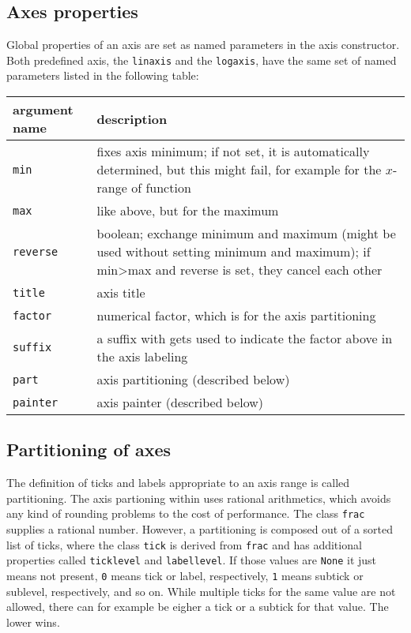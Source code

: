 \subsection{Axes properties}

Global properties of an axis are set as named parameters in the axis
constructor. Both predefined axis, the \verb|linaxis| and the
\verb|logaxis|, have the same set of named parameters listed in the
following table:

\medskip
\begin{tabularx}{\linewidth}{l>{\raggedright\arraybackslash}X}
argument name&description\\
\hline
\texttt{min}&fixes axis minimum; if not set, it is automatically
determined, but this might fail, for example for the $x$-range of
function\\
\texttt{max}&like above, but for the maximum\\
\texttt{reverse}&boolean; exchange minimum and maximum (might be used
without setting minimum and maximum); if min>max and reverse is set,
they cancel each other\\
\texttt{title}&axis title\\
\texttt{factor}&numerical factor, which is for the axis partitioning\\
\texttt{suffix}&a suffix with gets used to indicate the factor above
in the axis labeling\\
\texttt{part}&axis partitioning (described below)\\
\texttt{painter}&axis painter (described below)\\
\end{tabularx}
\medskip

\subsection{Partitioning of axes}

The definition of ticks and labels appropriate to an axis range is
called partitioning. The axis partioning within \PyX{} uses rational
arithmetics, which avoids any kind of rounding problems to the cost of
performance. The class \verb|frac| supplies a rational number.
However, a partitioning is composed out of a sorted list of ticks,
where the class \verb|tick| is derived from \verb|frac| and has
additional properties called \verb|ticklevel| and \verb|labellevel|.
If those values are \verb|None| it just means not present, \verb|0|
means tick or label, respectively, \verb|1| means subtick or sublevel,
respectively, and so on. While multiple ticks for the same value are
not allowed, there can for example be eigher a tick or a subtick for
that value. The lower wins.

